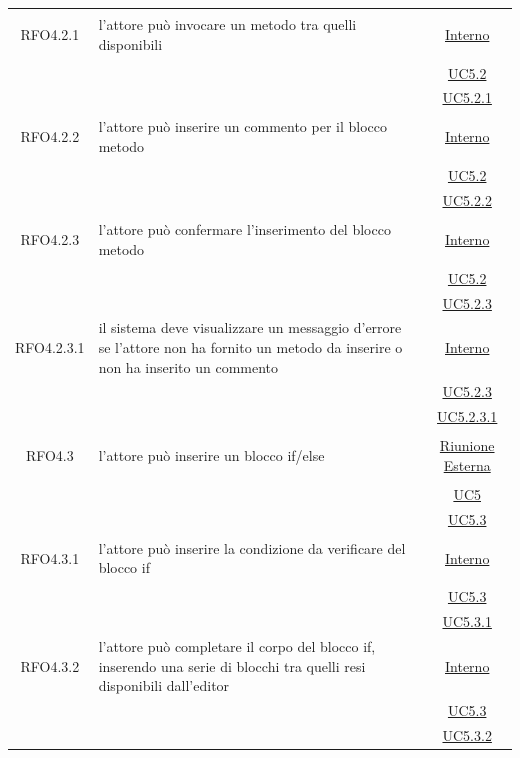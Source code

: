 \begin{longtable}{|c|>{\centering}m{7cm}|c|}
\hypertarget{RFO4.2.1}{RFO4.2.1} & l'attore può invocare un metodo tra quelli disponibili & \hyperlink{Interno}{Interno}\\
& &\hyperref[UC5.2]{UC5.2}\\
& &\hyperref[UC5.2.1]{UC5.2.1}\\ \hline

\hypertarget{RFO4.2.2}{RFO4.2.2} & l'attore può inserire un commento per il blocco metodo & \hyperlink{Interno}{Interno}\\
& &\hyperref[UC5.2]{UC5.2}\\
& &\hyperref[UC5.2.2]{UC5.2.2}\\ \hline

\hypertarget{RFO4.2.3}{RFO4.2.3} & l'attore può confermare l'inserimento del blocco metodo & \hyperlink{Interno}{Interno}\\
& &\hyperref[UC5.2]{UC5.2}\\
& &\hyperref[UC5.2.3]{UC5.2.3}\\ \hline

\hypertarget{RFO4.2.3.1}{RFO4.2.3.1} & il sistema deve visualizzare un messaggio d'errore se l'attore non ha fornito un metodo da inserire o non ha inserito un commento & \hyperlink{Interno}{Interno}\\
& &\hyperref[UC5.2.3]{UC5.2.3}\\
& &\hyperref[UC5.2.3.1]{UC5.2.3.1}\\ \hline

\hypertarget{RFO4.3}{RFO4.3} & l'attore può inserire un blocco if/else & \hyperlink{Riunione Esterna}{Riunione Esterna}\\
& &\hyperref[UC5]{UC5}\\
& &\hyperref[UC5.3]{UC5.3}\\ \hline

\hypertarget{RFO4.3.1}{RFO4.3.1} & l'attore può inserire la condizione da verificare del blocco if & \hyperlink{Interno}{Interno}\\
& &\hyperref[UC5.3]{UC5.3}\\
& &\hyperref[UC5.3.1]{UC5.3.1}\\ \hline

\hypertarget{RFO4.3.2}{RFO4.3.2} & l'attore può completare il corpo del blocco if, inserendo una serie di blocchi tra quelli resi disponibili dall'editor  & \hyperlink{Interno}{Interno}\\
& &\hyperref[UC5.3]{UC5.3}\\
& &\hyperref[UC5.3.2]{UC5.3.2}\\ \hline


\end{longtable}
